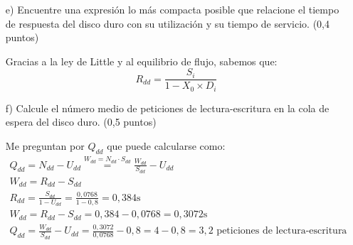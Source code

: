 \documentclass[a4paper,12pt]{article}
\begin{document}
\begin{enumerate}
    \item[e)] Encuentre una expresión lo más compacta posible que relacione el tiempo de respuesta del disco duro con su utilización y su tiempo de servicio. (0,4 puntos)
    
    Gracias a la ley de Little y al equilibrio de flujo, sabemos que:
    $$
    R_{dd} = \frac{S_i}{1- X_0 \times D_i}
    $$

    \item[f)] Calcule el número medio de peticiones de lectura-escritura en la cola de espera del disco duro. (0,5 puntos)

    Me preguntan por $Q_{dd}$ que puede calcularse como:
    \begin{align*}
        Q_{dd} = N_{dd} - U_{dd} \overset{W_{dd} = N_{dd}\cdot S_{dd}}{=} \frac{W_{dd}}{S_{dd}} -U_{dd} \\
        W_{dd} = R_{dd} - S_{dd} \\
        R_{dd} = \frac{S_{dd}}{1-U_{dd}} = \frac{0,0768}{1-0,8} = 0,384 \text{s} \\
        W_{dd} = R_{dd} - S_{dd} = 0,384 - 0,0768 = 0,3072 \text{s} \\
        Q_{dd} = \frac{W_{dd}}{S_{dd}} - U_{dd} = \frac{0,3072}{0,0768} - 0,8 = 4 - 0,8 = 3,2 \text{ peticiones de lectura-escritura}
    \end{align*}

\end{enumerate}
\end{document}
